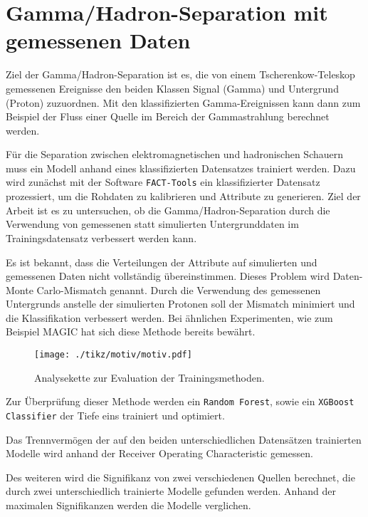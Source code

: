 \chapter{Gamma/Hadron-Separation mit gemessenen Daten}
Ziel der Gamma/Hadron-Separation ist es, die von einem Tscherenkow-Teleskop gemessenen Ereignisse den beiden Klassen Signal (Gamma) und Untergrund (Proton) zuzuordnen.
Mit den klassifizierten Gamma-Ereignissen kann dann zum Beispiel der Fluss einer Quelle im Bereich der Gammastrahlung berechnet werden.

Für die Separation zwischen elektromagnetischen und hadronischen Schauern muss ein Modell anhand eines klassifizierten Datensatzes trainiert werden.
Dazu wird zunächst mit der Software \texttt{FACT-Tools} \cite{Bockermann} ein klassifizierter Datensatz prozessiert, um die Rohdaten zu kalibrieren und Attribute zu generieren.
Ziel der Arbeit ist es zu untersuchen, ob die Gamma/Hadron-Separation durch die Verwendung von gemessenen statt simulierten Untergrunddaten im Trainingsdatensatz verbessert werden kann.

Es ist bekannt, dass die Verteilungen der Attribute auf simulierten und gemessenen Daten nicht vollständig übereinstimmen.
Dieses Problem wird Daten-Monte Carlo-Mismatch genannt.
Durch die Verwendung des gemessenen Untergrunds anstelle der simulierten Protonen soll der Mismatch minimiert und die Klassifikation verbessert werden.
Bei ähnlichen Experimenten, wie zum Beispiel MAGIC \cite{magic} hat sich diese Methode bereits bewährt. 
\begin{figure}[H]
  \centering
  \texttt{[image: ./tikz/motiv/motiv.pdf]}
  \caption{Analysekette zur Evaluation der Trainingsmethoden.}
\end{figure}
Zur Überprüfung dieser Methode werden ein \texttt{Random Forest}, sowie ein \texttt{XGBoost Classifier} der Tiefe eins trainiert und optimiert.

Das Trennvermögen der auf den beiden unterschiedlichen Datensätzen trainierten Modelle wird anhand der Receiver Operating Characteristic gemessen.

Des weiteren wird die Signifikanz von zwei verschiedenen Quellen berechnet, die durch zwei unterschiedlich trainierte Modelle gefunden werden. 
Anhand der maximalen Signifikanzen werden die Modelle verglichen.
